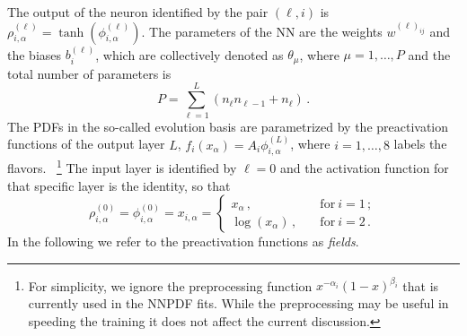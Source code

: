 \documentclass[11pt]{article}
\begin{document}
The output of the neuron identified by the pair $(\ell,i)$ is
$\rho^{(\ell)}_{i,\alpha} = \tanh\left(\phi^{(\ell)}_{i,\alpha}\right)$.
The parameters of the NN are the weights $w^{(\ell)_{ij}}$ and the biases $b^{(\ell)}_i$, which are
collectively denoted as $\theta_\mu$, where $\mu = 1, \ldots, P$ and the total number of parameters
is
\begin{equation}
    \label{eq:TotPar}
    P = \sum_{\ell=1}^{L} \left(n_{\ell} n_{\ell-1} + n_\ell\right)\, .
\end{equation}
The PDFs in the
so-called evolution basis are parametrized by the preactivation functions of the output layer $L$,
$f_i(x_\alpha)=A_i \phi^{(L)}_{i,\alpha}$, where $i=1, \ldots, 8$ labels the flavors.
~\footnote{For simplicity, we ignore the preprocessing function $x^{-\alpha_i} (1-x)^{\beta_i}$ that
is currently used in the NNPDF fits. While the preprocessing may be useful in speeding the training
it does not affect the current discussion.}
The input layer is identified by $\ell=0$ and the activation
function for that specific layer is the identity, so that
\begin{equation}
    \label{eq:InitLayerPhi}
    \rho^{(0)}_{i,\alpha} = \phi^{(0)}_{i,\alpha} = x_{i,\alpha} =
    \begin{cases}
        x_\alpha\, , \quad &\text{for}\ i=1\, ;\\
        \log\left(x_\alpha\right)\, , \quad &\text{for}\ i=2\, .
    \end{cases}
\end{equation}
In the following we refer to the preactivation functions as {\em fields}.
\end{document}
